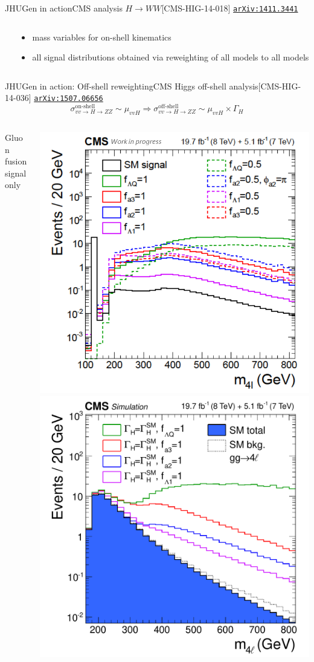 \documentclass[usenames,dvipsnames,svgnames,table]{beamer}
\newcommand{\arxiv}[1]{\href{http://arxiv.org/abs/#1}{\nolinkurl{arXiv:#1}}}
\renewcommand{\therefore}{\Rightarrow}
\begin{document}
\begin{frame}{JHUGen in action}{CMS analysis $H \to WW$\hfill [CMS-HIG-14-018] \arxiv{1411.3441}}
\begin{columns}
\begin{column}{0.6\textwidth}
\end{column}
\begin{column}{0.4\textwidth}
\begin{itemize}
\item mass variables for on-shell kinematics
\item all signal distributions obtained via reweighting of all models to all models
\end{itemize}
\end{column}
\end{columns}
\end{frame}

\begin{frame}{JHUGen in action: Off-shell reweighting}{CMS Higgs off-shell analysis\hfill [CMS-HIG-14-036] \arxiv{1507.06656}}
$$\sigma^\text{on-shell}_{vv\to H\to ZZ}\sim\mu_{vvH}\therefore \sigma^\text{off-shell}_{vv\to H\to ZZ}\sim \mu_{vvH}\times\Gamma_H$$
\begin{columns}
\begin{column}{0.1\textwidth}
Gluon fusion signal only %
\end{column}
\begin{column}{0.75\textwidth}
\includegraphics[width=0.5\columnwidth]{lifetime/signalonly}
\includegraphics[width=0.5\columnwidth]{lifetime/fig1}

\end{column}
\end{columns}
\end{frame}
\end{document}
